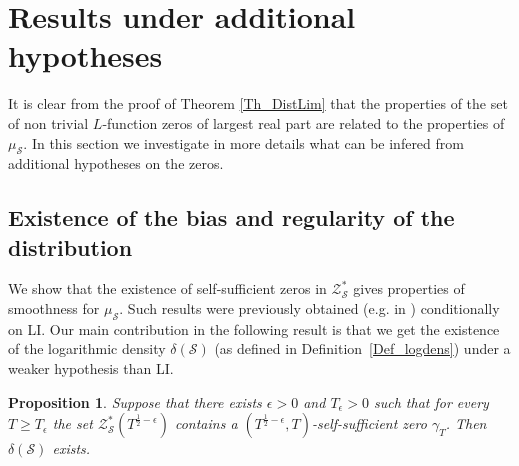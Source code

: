 \documentclass[a4paper,10pt]{amsart}
\theoremstyle{plain}
\newtheorem{prop}[theo]{Proposition}
\theoremstyle{definition}
\begin{document}
\section{Results under additional hypotheses}\label{Sec_AddHyp}

It is clear from the proof of Theorem \ref{Th_DistLim} 
that the properties of the set of non trivial $L$-function zeros of largest real part are related to the properties of $\mu_{\mathcal{S}}$.
In this section we investigate in more details what can be infered from additional hypotheses on the zeros.

\subsection{Existence of the bias and regularity of the distribution}\label{sub_Indep}

We show that the existence of self-sufficient zeros in $\mathcal{Z}_{\mathcal{S}}^{*}$ 
gives properties of smoothness for $\mu_{\mathcal{S}}$. 
Such results were previously obtained (e.g. in \cite{RS}) conditionally on LI.
Our main contribution in the following result is that we get the existence of the logarithmic density $\delta(\mathcal{S})$ (as defined in Definition~\ref{Def_logdens}) under a weaker hypothesis than LI.

\begin{prop}\label{Prop_Tautosuff}
	Suppose that there exists $\epsilon >0$ and $T_{\epsilon} >0$
	such that for every $T\geq T_{\epsilon}$ the set $\mathcal{Z}_{\mathcal{S}}^{*}(T^{\frac{1}{2} - \epsilon})$ 
	contains a $(T^{\frac{1}{2} - \epsilon},T)$-self-sufficient zero $\gamma_{T}$.
	Then $\delta(\mathcal{S})$ exists.
\end{prop}
\end{document}
